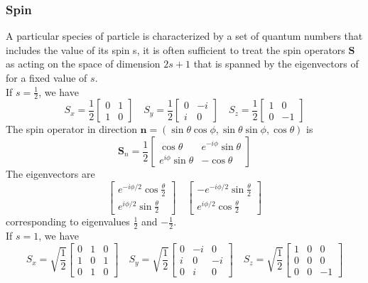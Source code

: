 \documentclass[cyan]{elegantnote}
\begin{document}
\subsubsection{Spin}
A particular species of particle is characterized by a set of quantum numbers that includes the value of its spin s, it is often sufficient to treat the spin operators $\bm{S}$ as acting on the space of dimension
$2s+1$ that is spanned by the eigenvectors of for a fixed value of $s$. \\
If $s= \frac{1}{2}$, we have
\[S_x = \frac{1}{2} \left[ \begin{matrix} 0& 1\\ 1& 0\end{matrix} \right] \quad S_y = \frac{1}{2} \left[ \begin{matrix} 0& -i\\ i& 0\end{matrix} \right] \quad S_z = \frac{1}{2} \left[ \begin{matrix} 1& 0\\ 0& -1\end{matrix} \right]\]
The spin operator in direction $\bm{n} = (\sin\theta\cos\phi,\sin\theta\sin\phi,\cos\theta)$ is
\[\bm{S}_{n} = \frac{1}{2} \left[ \begin{matrix} \cos\theta& e^{-i\phi}\sin\theta\\ e^{i\phi}\sin\theta& -\cos\theta\end{matrix} \right]\]
The eigenvectors are
\[\left[ \begin{matrix} e^{-i\phi/2}\cos\frac{\theta}{2}\\ e^{i\phi/2}\sin\frac{\theta}{2} \end{matrix} \right] \quad \left[ \begin{matrix} -e^{-i\phi/2}\sin\frac{\theta}{2}\\ e^{i\phi/2}\cos\frac{\theta}{2} \end{matrix} \right]\]
corresponding to eigenvalues $\frac{1}{2}$ and $-\frac{1}{2}$.\\
If $s= 1$, we have
\[S_x = \sqrt{\frac{1}{2}} \left[ \begin{matrix} 0& 1& 0\\ 1& 0& 1\\ 0& 1& 0\end{matrix} \right]  \quad S_y = \sqrt{\frac{1}{2}} \left[ \begin{matrix} 0& -i& 0\\ i& 0& -i\\ 0& i& 0\end{matrix} \right] \quad S_z = \sqrt{\frac{1}{2}} \left[ \begin{matrix} 1& 0& 0\\ 0& 0& 0\\ 0& 0& -1\end{matrix} \right]\]
\end{document}
